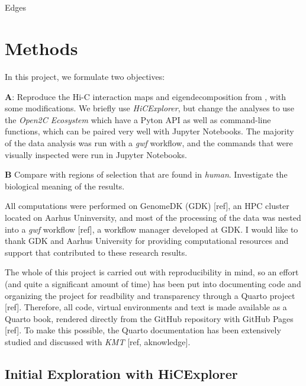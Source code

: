 \documentclass[
  11pt,
  a4paper,
]{scrbook}
\makeatletter
\let\oldparagraph\paragraph
\renewcommand{\paragraph}{
    \@ifstar
      \xxxParagraphStar
      \xxxParagraphNoStar
  }
\newcommand{\xxxParagraphStar}[1]{\oldparagraph*{#1}\mbox{}}
\newcommand{\xxxParagraphNoStar}[1]{\oldparagraph{#1}\mbox{}}
\let\oldemph\emph
\renewcommand\emph[1]{\oldemph{\color{gray}#1}}
\makeatother
\begin{document}
\paragraph{Edges}\label{edges}

\newpage{}

\chapter{Methods}\label{methods}

In this project, we formulate two objectives:

\textbf{A}: Reproduce the Hi-C interaction maps and eigendecomposition
from \citep{wang_reprogramming_2019}, with some modifications. We
briefly use \emph{HiCExplorer}, but change the analyses to use the
\emph{Open2C Ecosystem} \citep{open2c} which have a Pyton API as well as
command-line functions, which can be paired very well with Jupyter
Notebooks. The majority of the data analysis was run with a \emph{gwf}
workflow, and the commands that were visually inspected were run in
Jupyter Notebooks.

\textbf{B} Compare with regions of selection that are found in
\emph{human}. Investigate the biological meaning of the results.

All computations were performed on GenomeDK (GDK) {[}ref{]}, an HPC
cluster located on Aarhus Uninversity, and most of the processing of the
data was nested into a \emph{gwf} workflow {[}ref{]}, a workflow manager
developed at GDK. I would like to thank GDK and Aarhus University for
providing computational resources and support that contributed to these
research results.

The whole of this project is carried out with reproducibility in mind,
so an effort (and quite a significant amount of time) has been put into
documenting code and organizing the project for readbility and
transparency through a Quarto project {[}ref{]}. Therefore, all code,
virtual environments and text is made available as a Quarto book,
rendered directly from the GitHub repository with GitHub Pages
{[}ref{]}. To make this possible, the Quarto documentation has been
extensively studied and discussed with \emph{KMT} {[}ref, aknowledge{]}.

\section{Initial Exploration with
HiCExplorer}\label{initial-exploration-with-hicexplorer}
\end{document}
